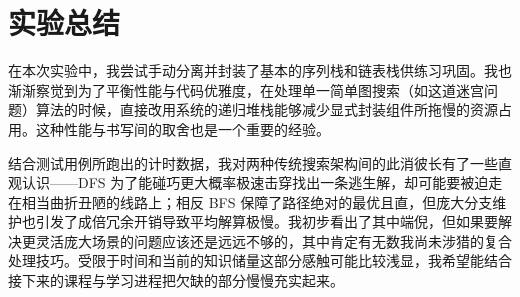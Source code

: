 \documentclass[12pt,a4paper]{ctexart}
\begin{document}
	\section{实验总结}
	在本次实验中，我尝试手动分离并封装了基本的序列栈和链表栈供练习巩固。我也渐渐察觉到为了平衡性能与代码优雅度，在处理单一简单图搜索（如这道迷宫问题）算法的时候，直接改用系统的递归堆栈能够减少显式封装组件所拖慢的资源占用。这种性能与书写间的取舍也是一个重要的经验。
	
	结合测试用例所跑出的计时数据，我对两种传统搜索架构间的此消彼长有了一些直观认识——DFS 为了能碰巧更大概率极速击穿找出一条逃生解，却可能要被迫走在相当曲折丑陋的线路上；相反 BFS 保障了路径绝对的最优且直，但庞大分支维护也引发了成倍冗余开销导致平均解算极慢。我初步看出了其中端倪，但如果要解决更灵活庞大场景的问题应该还是远远不够的，其中肯定有无数我尚未涉猎的复合处理技巧。受限于时间和当前的知识储量这部分感触可能比较浅显，我希望能结合接下来的课程与学习进程把欠缺的部分慢慢充实起来。
	
\end{document}
